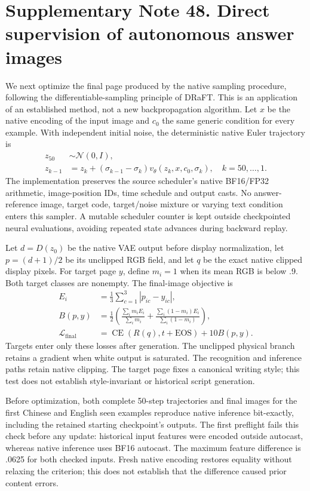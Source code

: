 \clearpage
\section*{Supplementary Note 48. Direct supervision of autonomous answer images}

We next optimize the final page produced by the native sampling procedure,
following the differentiable-sampling principle of DRaFT\cite{draft}.
This is an application of an established method, not a new backpropagation
algorithm. Let $x$ be the native encoding of the input image and $c_0$ the
same generic condition for every example. With independent initial noise,
the deterministic native Euler trajectory is
\begin{align}
 z_{50}&\sim\mathcal N(0,I),\\
 z_{k-1}&=z_k+(\sigma_{k-1}-\sigma_k)
             v_\theta(z_k,x,c_0,\sigma_k),\quad k=50,\ldots,1.
\end{align}
The implementation preserves the source scheduler's native BF16/FP32
arithmetic, image-position IDs, time schedule and output casts. No answer-reference
image, target code, target/noise mixture or varying text condition enters
this sampler. A mutable scheduler counter is kept outside checkpointed
neural evaluations, avoiding repeated state advances during backward replay.

Let $d=D(z_0)$ be the native VAE output before display normalization, let
$p=(d+1)/2$ be its unclipped RGB field, and let $q$ be the exact native
clipped display pixels. For target page $y$, define $m_i=1$ when its mean
RGB is below .9. Both target classes are nonempty. The final-image objective is
\begin{align}
 E_i&=\tfrac13\sum_{c=1}^{3}|p_{ic}-y_{ic}|,\\
 B(p,y)&=\tfrac12\left(
       \frac{\sum_i m_iE_i}{\sum_i m_i}
       +\frac{\sum_i(1-m_i)E_i}{\sum_i(1-m_i)}\right),\\
 \mathcal L_{\mathrm{final}}&=
       \operatorname{CE}(R(q),t+\mathrm{EOS})+10B(p,y).
\end{align}
Targets enter only these losses after generation. The unclipped physical
branch retains a gradient when white output is saturated. The recognition
and inference paths retain native clipping. The target page fixes a canonical
writing style; this test does not establish style-invariant or historical
script generation.

Before optimization, both complete 50-step trajectories and final images for
the first Chinese and English seen examples reproduce native inference
bit-exactly, including the retained starting checkpoint's outputs. The first
preflight fails this check before any update: historical input features were
encoded outside autocast, whereas native inference uses BF16 autocast. The
maximum feature difference is .0625 for both checked inputs. Fresh native
encoding restores equality without relaxing the criterion; this does not
establish that the difference caused prior content errors.

